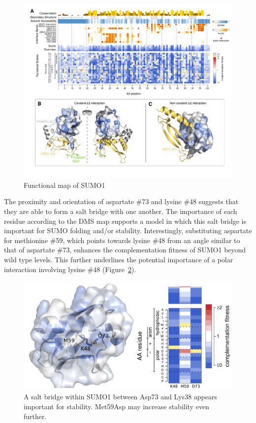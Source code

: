\begin{figure}[h!]
	\centering
	\includegraphics[width=\textwidth]{img/sumo-map.pdf}
	\caption{Functional map of SUMO1}
	\label{fig:sumo-map}
\end{figure}

The proximity and orientation of aspartate \#73 and lysine \#48 suggests that they are able to form a salt bridge with one another.  The importance of each residue according to the DMS map supports a model in which this salt bridge is important for SUMO folding and/or stability. Interestingly, substituting aspartate for methionine \#59, which points towards lysine \#48 from an angle similar to that of aspartate \#73, enhances the complementation fitness of SUMO1 beyond wild type levels.  This further underlines the potential importance of a polar interaction involving lysine \#48 (Figure~\ref{fig:saltbridge}).

\begin{figure}[h!]
	\centering
	\includegraphics[width=\textwidth]{img/saltbridge.pdf}
	\caption{A salt bridge within SUMO1 between Asp73 and Lys38 appears important for stability. Met59Asp may increase stability even further.}
	\label{fig:saltbridge}
\end{figure}


